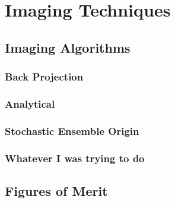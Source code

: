 \chapter{Imaging Techniques}\label{ch:techniques}

\section{Imaging Algorithms}

\subsection{Back Projection}

\subsection{Analytical}

\subsection{Stochastic Ensemble Origin}

\subsection{Whatever I was trying to do}

\section{Figures of Merit}

